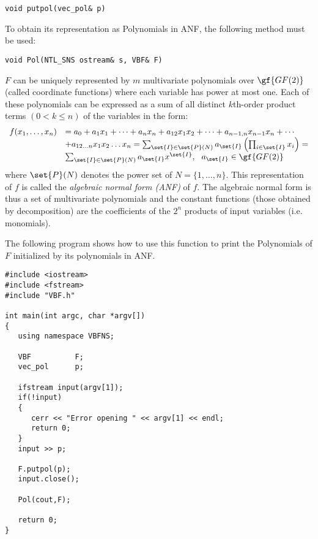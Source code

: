 \begin{verbatim}
void putpol(vec_pol& p)
\end{verbatim}

To obtain its representation as Polynomials in ANF, the following method must be used:

\begin{verbatim}
void Pol(NTL_SNS ostream& s, VBF& F)
\end{verbatim}

$F$ can be uniquely represented by $m$ multivariate polynomials over $\gf{GF(2)}$ (called coordinate functions) where each variable has power at most one. Each of these polynomials can be
expressed as a sum of all distinct $k$th-order product terms $(0 < k \leq n)$ of the variables in the form: 
\begin{equation}
\begin{array}{ll}
f(x_1,\dots,x_n) &= a_0+a_1 x_1+\dotsb+a_n
x_n+a_{12}x_1x_2+\dotsb+a_{n-1,n}x_{n-1}x_n+\dotsb \\ &+a_{12\dots n}x_1x_2\dots x_n 
= \sum_{\set{I} \in \set{P}(N)} a_{\set{I}}\left(\prod_{i \in \set{I}} x_i\right) = \\
& \sum_{\set{I} \in \set{P}(N)} a_{\set{I}} x^{\set{I}}, \ \ a_{\set{I}} \in \gf{GF(2)}
\end{array}
\end{equation}
where $\set{P}(N)$ denotes the power set of $N=\{1,\dots,n\}$. This representation of $f$ is called the \textsl{algebraic normal form (ANF)}\label{sym:ANF} of $f$. The algebraic normal form is thus a set of multivariate polynomials and the constant functions (those obtained by decomposition) are the coefficients of the $2^n$ products of input variables (i.e. monomials).

The following program shows how to use this function to print the Polynomials of $F$ initialized by its polynomials in ANF.

\begin{verbatim}
#include <iostream>
#include <fstream>
#include "VBF.h"

int main(int argc, char *argv[])
{
   using namespace VBFNS;

   VBF          F;
   vec_pol      p;

   ifstream input(argv[1]);
   if(!input)
   {
      cerr << "Error opening " << argv[1] << endl;
      return 0;
   }
   input >> p;

   F.putpol(p);
   input.close();

   Pol(cout,F);

   return 0;
}
\end{verbatim}

